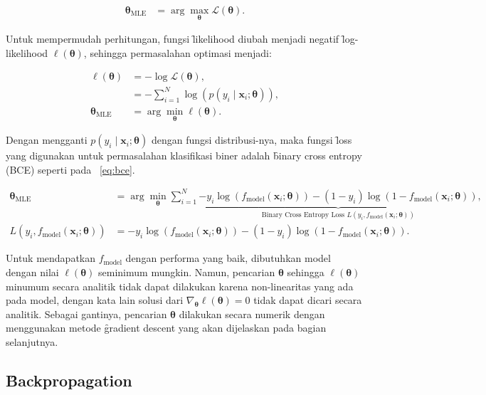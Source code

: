     \begin{align}
        \bm{\theta}_{\text{MLE}} &= \arg\max_{\bm{\theta}} \mathcal{L}(\bm{\theta}).
    \end{align}

    Untuk mempermudah perhitungan, fungsi \f{likelihood} diubah menjadi negatif \f{log-likelihood} $\mathcal{\ell}(\bm{\theta})$, sehingga permasalahan optimasi menjadi:

    \begin{align}
        \ell{(\bm{\theta})} &= -\log\mathcal{L}(\bm{\theta}), \\
        &= -\sum_{i=1}^N \log\left(p(y_i \mid \mathbf{x}_i; \bm{\theta})\right), \\
        \bm{\theta}_{\text{MLE}} &= \arg\min_{\bm{\theta}} \ell(\bm{\theta}).
    \end{align} 

    Dengan mengganti $p(y_i \mid \mathbf{x}_i; \bm{\theta})$ dengan fungsi distribusi-nya, maka fungsi \f{loss} yang digunakan untuk permasalahan klasifikasi biner adalah \f{binary cross entropy} (BCE) seperti pada \equ~\ref{eq:bce}.

    \begin{align}
        \bm{\theta}_{\text{MLE}} &= \arg\min_{\bm{\theta}}\sum_{i=1}^{N}\underbrace{-y_i \log\left(f_{\text{model}}(\mathbf{x}_i; \bm{\theta})\right) - (1 - y_i) \log\left(1 - f_{\text{model}}(\mathbf{x}_i; \bm{\theta})\right)}_{\text{Binary Cross Entropy Loss } L(y_i, f_{\text{model}}(\mathbf{x}_i; \bm{\theta}))}, \\
        \label{eq:bce} 
        L(y_i, f_{\text{model}}(\mathbf{x}_i; \bm{\theta})) &= -y_i \log\left(f_{\text{model}}(\mathbf{x}_i; \bm{\theta})\right) - (1 - y_i) \log\left(1 - f_{\text{model}}(\mathbf{x}_i; \bm{\theta})\right).
    \end{align}

    Untuk mendapatkan $f_\text{model}$ dengan performa yang baik, dibutuhkan model dengan nilai $\ell(\bm{\theta})$ seminimum mungkin. Namun, pencarian $\bm{\theta}$ sehingga $ \ell (\bm{\theta})$ minumum secara analitik tidak dapat dilakukan karena non-linearitas yang ada pada model, dengan kata lain solusi dari $\nabla_{\bm{\theta}} \ell(\bm{\theta}) = 0$ tidak dapat dicari secara analitik. Sebagai gantinya, pencarian $\bm{\theta}$ dilakukan secara numerik dengan menggunakan metode \f{gradient descent} yang akan dijelaskan pada bagian selanjutnya.
    
    \subsection{\f{Backpropagation}}

